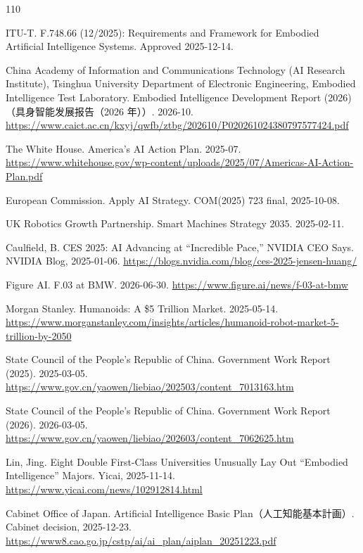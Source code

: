 \documentclass[10pt]{article}
\begin{document}
\begin{thebibliography}{110}\small

ITU-T. F.748.66 (12/2025): Requirements and Framework for Embodied Artificial Intelligence Systems. Approved 2025-12-14.

China Academy of Information and Communications Technology (AI Research Institute), Tsinghua University Department of Electronic Engineering, Embodied Intelligence Test Laboratory. Embodied Intelligence Development Report (2026)（具身智能发展报告（2026 年））. 2026-10. \url{https://www.caict.ac.cn/kxyj/qwfb/ztbg/202610/P020261024380797577424.pdf}

The White House. America's AI Action Plan. 2025-07. \url{https://www.whitehouse.gov/wp-content/uploads/2025/07/Americas-AI-Action-Plan.pdf}

European Commission. Apply AI Strategy. COM(2025) 723 final, 2025-10-08.

UK Robotics Growth Partnership. Smart Machines Strategy 2035. 2025-02-11.

Caulfield, B. CES 2025: AI Advancing at ``Incredible Pace,'' NVIDIA CEO Says. NVIDIA Blog, 2025-01-06. \url{https://blogs.nvidia.com/blog/ces-2025-jensen-huang/}

Figure AI. F.03 at BMW. 2026-06-30. \url{https://www.figure.ai/news/f-03-at-bmw}

Morgan Stanley. Humanoids: A \$5 Trillion Market. 2025-05-14. \url{https://www.morganstanley.com/insights/articles/humanoid-robot-market-5-trillion-by-2050}

State Council of the People's Republic of China. Government Work Report (2025). 2025-03-05. \url{https://www.gov.cn/yaowen/liebiao/202503/content_7013163.htm}

State Council of the People's Republic of China. Government Work Report (2026). 2026-03-05. \url{https://www.gov.cn/yaowen/liebiao/202603/content_7062625.htm}

Lin, Jing. Eight Double First-Class Universities Unusually Lay Out ``Embodied Intelligence'' Majors. Yicai, 2025-11-14. \url{https://www.yicai.com/news/102912814.html}

Cabinet Office of Japan. Artificial Intelligence Basic Plan（人工知能基本計画）. Cabinet decision, 2025-12-23. \url{https://www8.cao.go.jp/cstp/ai/ai_plan/aiplan_20251223.pdf}


\end{thebibliography}
\end{document}
